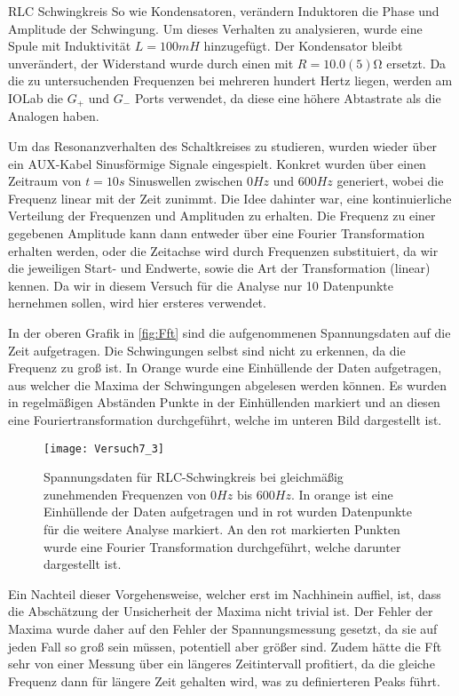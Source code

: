 \documentclass{alex_gp}
\begin{document}
\begin{mybox}{RLC Schwingkreis}
	So wie Kondensatoren, verändern Induktoren die Phase und Amplitude der Schwingung. Um dieses Verhalten zu analysieren, wurde eine Spule mit Induktivität \( L = 100 \unit{mH} \) hinzugefügt. Der Kondensator bleibt unverändert, der Widerstand wurde durch einen mit \( R = 10.0(5) \unit{\ohm} \) ersetzt. Da die zu untersuchenden Frequenzen bei mehreren hundert Hertz liegen, werden am IOLab die \( G_+ \) und \( G_- \) Ports verwendet, da diese eine höhere Abtastrate als die Analogen haben. 
	
	Um das Resonanzverhalten des Schaltkreises zu studieren, wurden wieder über ein AUX-Kabel Sinusförmige Signale eingespielt. Konkret wurden über einen Zeitraum von \( t = 10 \unit{s} \) Sinuswellen zwischen \( 0 \unit{Hz} \) und \( 600 \unit{Hz} \) generiert, wobei die Frequenz linear mit der Zeit zunimmt. Die Idee dahinter war, eine kontinuierliche Verteilung der Frequenzen und Amplituden zu erhalten. 
	Die Frequenz zu einer gegebenen Amplitude kann dann entweder über eine Fourier Transformation erhalten werden, oder die Zeitachse wird durch Frequenzen substituiert, da wir die jeweiligen Start- und Endwerte, sowie die Art der Transformation (linear) kennen. Da wir in diesem Versuch für die Analyse nur 10 Datenpunkte hernehmen sollen, wird hier ersteres verwendet. 
	
	In der oberen Grafik in \autoref{fig:Fft} sind die aufgenommenen Spannungsdaten auf die Zeit aufgetragen. Die Schwingungen selbst sind nicht zu erkennen, da die Frequenz zu groß ist. In Orange wurde eine Einhüllende der Daten aufgetragen, aus welcher die Maxima der Schwingungen abgelesen werden können. Es wurden in regelmäßigen Abständen Punkte in der Einhüllenden markiert und an diesen eine Fouriertransformation durchgeführt, welche im unteren Bild dargestellt ist. 
	\begin{figure}[H]	
		\centering
		\texttt{[image: Versuch7\_3]}
		\caption{Spannungsdaten für RLC-Schwingkreis bei gleichmäßig zunehmenden Frequenzen von \( 0 \unit{Hz} \) bis \( 600 \unit{Hz} \). In orange ist eine Einhüllende der Daten aufgetragen und in rot wurden Datenpunkte für die weitere Analyse markiert. An den rot markierten Punkten wurde eine Fourier Transformation durchgeführt, welche darunter dargestellt ist.}
		\label{fig:Fft}
	\end{figure}

	Ein Nachteil dieser Vorgehensweise, welcher erst im Nachhinein auffiel, ist, dass die Abschätzung der Unsicherheit der Maxima nicht trivial ist. Der Fehler der Maxima wurde daher auf den Fehler der Spannungsmessung gesetzt, da sie auf jeden Fall so groß sein müssen, potentiell aber größer sind. Zudem hätte die Fft sehr von einer Messung über ein längeres Zeitintervall profitiert, da die gleiche Frequenz dann für längere Zeit gehalten wird, was zu definierteren Peaks führt. 
	

\end{mybox}
\end{document}
